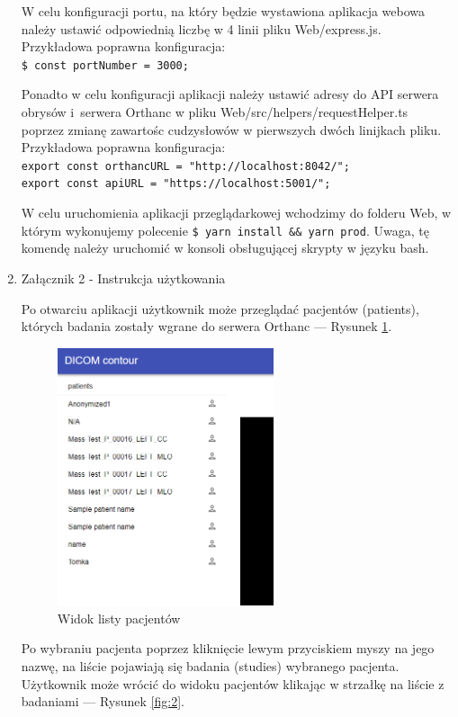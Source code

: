 \documentclass[a4paper,11pt,twoside,openright]{report}
\theoremstyle{definition}
\begin{document}
\begin{enumerate}
W celu konfiguracji portu, na który będzie wystawiona aplikacja webowa należy
ustawić odpowiednią liczbę w 4 linii pliku Web/express.js. Przykładowa poprawna
konfiguracja:\\
\texttt{\$ const portNumber = 3000;}

Ponadto w celu konfiguracji aplikacji należy ustawić adresy do API serwera obrysów
i~serwera Orthanc w pliku Web/src/helpers/requestHelper.ts poprzez zmianę zawartośc
cudzysłowów w pierwszych dwóch linijkach pliku. 	Przykładowa poprawna konfiguracja:\\
\texttt{export const orthancURL = "http://localhost:8042/";}\\
\texttt{export const apiURL = "https://localhost:5001/";}

W celu uruchomienia aplikacji przeglądarkowej wchodzimy do folderu Web, w którym
wykonujemy polecenie \texttt{\$ yarn install \&\& yarn prod}. Uwaga, tę komendę
należy uruchomić w konsoli obsługującej skrypty w języku bash.




\newpage
\item Załącznik 2 - Instrukcja użytkowania

Po otwarciu aplikacji użytkownik może przeglądać pacjentów (patients), których
badania zostały wgrane do serwera Orthanc --- Rysunek \ref{fig:1}.

\begin{figure}[h!]
	\center
	\includegraphics[width=0.6\textwidth]{1}
	\caption{Widok listy pacjentów}
    	\label{fig:1}
\end{figure}

Po wybraniu pacjenta poprzez kliknięcie lewym przyciskiem myszy na jego nazwę,
na liście pojawiają się badania (studies) wybranego pacjenta. Użytkownik może
wrócić do widoku pacjentów klikając w strzałkę na liście z badaniami --- Rysunek \ref{fig:2}.


\end{enumerate}
\end{document}
